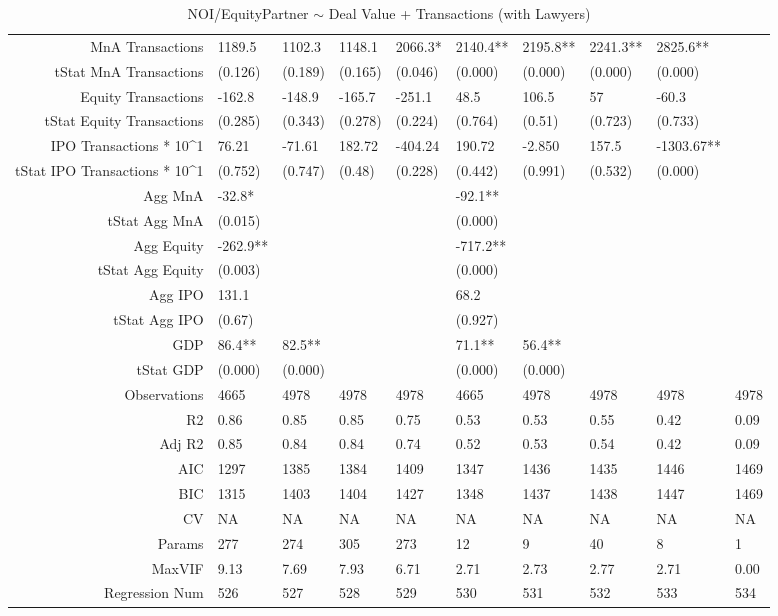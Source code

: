 \begin{table}[ht]
\begin{tabular}{rlllllllll}
  MnA Transactions & 1189.5 & 1102.3 & 1148.1 & 2066.3* & 2140.4** & 2195.8** & 2241.3** & 2825.6** &  \\ 
  tStat MnA Transactions & (0.126) & (0.189) & (0.165) & (0.046) & (0.000) & (0.000) & (0.000) & (0.000) &  \\ 
  Equity Transactions & -162.8 & -148.9 & -165.7 & -251.1 & 48.5 & 106.5 & 57 & -60.3 &  \\ 
  tStat Equity Transactions & (0.285) & (0.343) & (0.278) & (0.224) & (0.764) & (0.51) & (0.723) & (0.733) &  \\ 
  IPO Transactions * 10^1 & 76.21 & -71.61 & 182.72 & -404.24 & 190.72 & -2.850 & 157.5 & -1303.67** &  \\ 
  tStat IPO Transactions * 10^1 & (0.752) & (0.747) & (0.48) & (0.228) & (0.442) & (0.991) & (0.532) & (0.000) &  \\ 
  Agg MnA & -32.8* &  &  &  & -92.1** &  &  &  &  \\ 
  tStat Agg MnA & (0.015) &  &  &  & (0.000) &  &  &  &  \\ 
  Agg Equity & -262.9** &  &  &  & -717.2** &  &  &  &  \\ 
  tStat Agg Equity & (0.003) &  &  &  & (0.000) &  &  &  &  \\ 
  Agg IPO & 131.1 &  &  &  & 68.2 &  &  &  &  \\ 
  tStat Agg IPO & (0.67) &  &  &  & (0.927) &  &  &  &  \\ 
  GDP & 86.4** & 82.5** &  &  & 71.1** & 56.4** &  &  &  \\ 
  tStat GDP & (0.000) & (0.000) &  &  & (0.000) & (0.000) &  &  &  \\ 
  Observations & 4665 & 4978 & 4978 & 4978 & 4665 & 4978 & 4978 & 4978 & 4978 \\ 
  R2 & 0.86 & 0.85 & 0.85 & 0.75 & 0.53 & 0.53 & 0.55 & 0.42 & 0.09 \\ 
  Adj R2 & 0.85 & 0.84 & 0.84 & 0.74 & 0.52 & 0.53 & 0.54 & 0.42 & 0.09 \\ 
  AIC & 1297 & 1385 & 1384 & 1409 & 1347 & 1436 & 1435 & 1446 & 1469 \\ 
  BIC & 1315 & 1403 & 1404 & 1427 & 1348 & 1437 & 1438 & 1447 & 1469 \\ 
  CV & NA & NA & NA & NA & NA & NA & NA & NA & NA \\ 
  Params & 277 & 274 & 305 & 273 & 12 & 9 & 40 & 8 & 1 \\ 
  MaxVIF & 9.13 & 7.69 & 7.93 & 6.71 & 2.71 & 2.73 & 2.77 & 2.71 & 0.00 \\ 
  Regression Num & 526 & 527 & 528 & 529 & 530 & 531 & 532 & 533 & 534 \\ 
   \hline
\end{tabular}
\caption{NOI/EquityPartner $\sim$ Deal Value + Transactions (with Lawyers)} 
\end{table}
